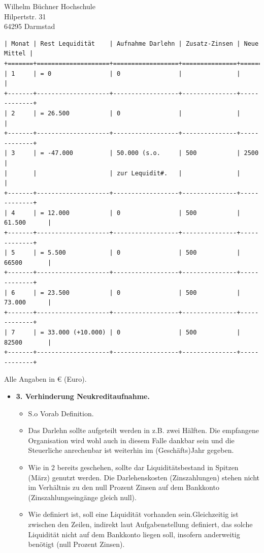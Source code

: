 \documentclass[
    version=last,           %
    DIV=13,                 %
    BCOR=0mm,               %
    paper=a4,               %
    fontsize=12pt,          %
    firsthead=on,           %
    firstfoot=on,           %
    pagenumber=on,i         %
    parskip=half,           %
    enlargefirstpage=,      %
    firsthead=on,           %
    fromrule=afteraddress,  %
    priority=off,           %
    backaddress=true,       %
    refline=dateright,      %
	fromalign=right,	    %
    fromemail=on,i          %
    fromurl=on,             %
    frombank=on,
    fromphone=on,           %
    frommobilephone=on      %
    fromlogo=on,            %
    addrfield=on,           %
    subject=untitled,  %
    foldmarks=off,          %
    numericaldate=off,      %
	pagenumber=right,	        %
	parskip=half,	        %
    headsep=false,          %
    footsepline=true,       %
    foldmarks=off,		    %
	]{scrlttr2}
\begin{document}
\begin{letter} {Wilhelm Büchner Hochschule \\
Hilpertstr. 31\\
64295 Darmstad}
\begin{verbatim}
| Monat | Rest Lequidität    | Aufnahme Darlehn | Zusatz-Zinsen | Neue Mittel |
+=======+====================+==================+===============+=============+
| 1     | = 0                | 0                |               |             |
+-------+--------------------+------------------+---------------+-------------+
| 2     | = 26.500           | 0                |               |             |
+-------+--------------------+------------------+---------------+-------------+
| 3     | = -47.000          | 50.000 (s.o.     | 500           | 2500        |
|       |                    | zur Lequidit#.   |               |             |
+-------+--------------------+------------------+---------------+-------------+
| 4     | = 12.000           | 0                | 500           | 61.500      |
+-------+--------------------+------------------+---------------+-------------+
| 5     | = 5.500            | 0                | 500           | 66500       |
+-------+--------------------+------------------+---------------+-------------+
| 6     | = 23.500           | 0                | 500           | 73.000      |
+-------+--------------------+------------------+---------------+-------------+
| 7     | = 33.000 (+10.000) | 0                | 500           | 82500       |
+-------+--------------------+------------------+---------------+-------------+
\end{verbatim}

Alle Angaben in € (Euro).

\begin{itemize}
    \item \textbf{3. Verhinderung Neukreditaufnahme.}

    \begin{itemize}
        \item S.o Vorab Definition.
        \item Das Darlehn sollte aufgeteilt werden in z.B. zwei Hälften. Die
            empfangene Organisation wird wohl auch in diesem Falle dankbar sein
            und die Steuerliche anrechenbar ist weiterhin im (Geschäfts)Jahr
            gegeben.
        \item Wie in 2 bereits geschehen, sollte dar Liquiditätsbestand in
            Spitzen (März) genutzt werden. Die Darlehenskosten (Zinszahlungen)
            stehen nicht im Verhältnis zu den null Prozent Zinsen auf dem
            Bankkonto (Zinszahlungseingänge gleich null).
    \item Wie definiert ist, soll eine Liquidität vorhanden sein.Gleichzeitig
        ist zwischen den Zeilen, indirekt laut Aufgabenstellung definiert, das
        solche Liquidität nicht auf dem Bankkonto liegen soll, insofern
        anderweitig benötigt (null Prozent Zinsen).
    \end{itemize}
\end{itemize}


\end{letter}
\end{document}
